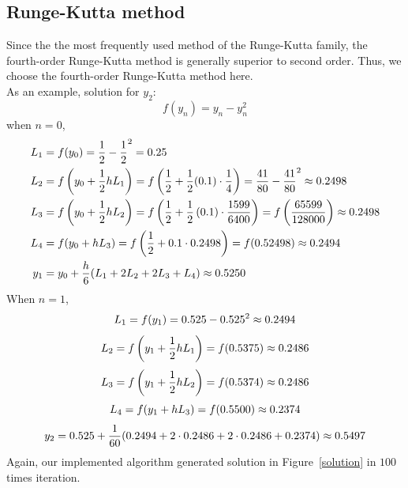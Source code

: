 \documentclass[
11pt, %
a4paper, %
oneside, %
headinclude,footinclude, %
BCOR5mm, %
]{scrartcl}
\begin{document}
\subsection{Runge-Kutta method}
Since the the most frequently used method of the Runge-Kutta family, the fourth-order Runge-Kutta method is generally superior to second order. Thus, we choose the fourth-order Runge-Kutta method here.\\
As an example, solution for $y_2$: \\
\begin{equation}
    f(y_n) = y_n - y_n^{2} \tag{3.3}
\end{equation}
when $n = 0$,
\begin{align}
     L_1 &= f(y_0) = \frac{1}{2} - \frac{1}{2}^{2} = 0.25 \notag \\
     L_2 &= f\left(y_0 + \frac{1}{2}hL_1\right) = f\left(\frac{1}{2} + \frac{1}{2}(0.1) \cdot \frac{1}{4}\right) = \frac{41}{80} - \frac{41}{80}^{2} \approx 0.2498 \notag \\
     L_3 &= f\left(y_0 + \frac{1}{2}hL_2 \right) = f\left(\frac{1}{2} + \frac{1}{2}\left(0.1\right)\cdot \frac{1599}{6400}\right) = f\left(\frac{65599}{128000}\right) \approx 0.2498 \notag \\
     L_4 &= f(y_0 + hL_3) = f\left(\frac{1}{2} + 0.1\cdot 0.2498\right) = f(0.52498) \approx 0.2494 \notag \\
     y_1 &= y_0 + \frac{h}{6}(L_1 + 2L_2 + 2L_3 + L_4) \approx 0.5250 \notag
\end{align}
When $n = 1$,
\begin{equation}
    L_1 = f(y_1) = 0.525 - 0.525^{2} \approx 0.2494 \notag
\end{equation}
\begin{equation}
    L_2 = f\left(y_1 +\frac{1}{2}hL_1\right) = f(0.5375) \approx 0.2486 \notag
\end{equation}
\begin{equation}
    L_3 = f\left(y_1 + \frac{1}{2}hL_2\right) = f(0.5374) \approx 0.2486\notag
\end{equation}
\begin{equation}
    L_4 = f(y_1 + hL_3) = f(0.5500) \approx 0.2374\notag
\end{equation}
\begin{equation}
    y_2 = 0.525 + \frac{1}{60}(0.2494 + 2\cdot 0.2486 + 2\cdot 0.2486 + 0.2374) \approx 0.5497 \notag
\end{equation}
Again, our implemented algorithm generated solution in Figure~\vref{solution} in $100$ times iteration.
\end{document}
